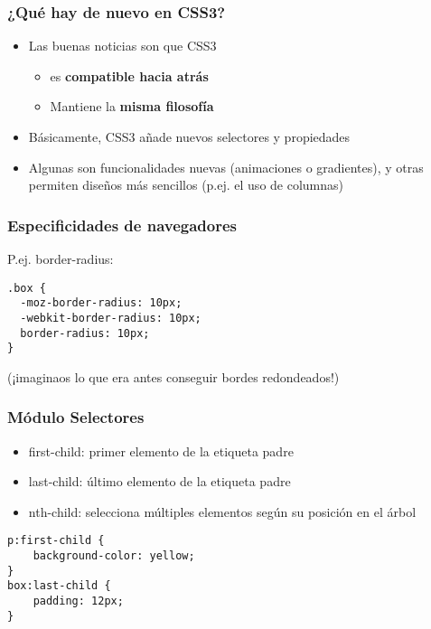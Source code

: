 
\begin{frame}
\frametitle{¿Qué hay de nuevo en CSS3?}

\begin{itemize}
  \item Las buenas noticias son que CSS3
  \begin{itemize}
    \item es {\bf compatible hacia atrás}
    \item Mantiene la {\bf misma filosofía}
  \end{itemize}
  \item Básicamente, CSS3 añade nuevos selectores y propiedades
  \item Algunas son funcionalidades nuevas (animaciones o gradientes),
y otras permiten diseños más sencillos (p.ej. el uso de columnas)
\end{itemize}

\end{frame}



\begin{frame}[fragile]
\frametitle{Especificidades de navegadores}

P.ej. border-radius:

\begin{footnotesize}
\begin{verbatim}
.box {
  -moz-border-radius: 10px;
  -webkit-border-radius: 10px;
  border-radius: 10px;
}
\end{verbatim}
\end{footnotesize}

(¡imaginaos lo que era antes conseguir bordes redondeados!)

\end{frame}



\begin{frame}[fragile]
\frametitle{Módulo Selectores}

\begin{itemize}
  \item first-child: primer elemento de la etiqueta padre
  \item last-child: último elemento de la etiqueta padre
  \item nth-child: selecciona múltiples elementos según su posición en el árbol
\end{itemize}

\begin{footnotesize}
\begin{verbatim}
p:first-child {
    background-color: yellow;
}
box:last-child {
    padding: 12px;
} 
\end{verbatim}
\end{footnotesize}

\end{frame}


